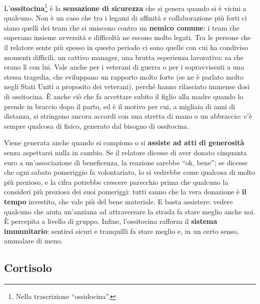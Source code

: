 L'\textbf{ossitocina}\footnote{Nella trascrizione ``ossidocina''.} è la \textbf{sensazione di
sicurezza} che si genera quando si è vicini a qualcuno. Non è un caso che tra i legami di
affinità e collaborazione più forti ci siano quelli dei team che si uniscono contro un
\textbf{nemico comune}: i team che superano insieme avversità e difficoltà ne escono molto
legati. Tra le persone che il relatore sente più spesso in questo periodo ci sono quelle con cui
ha condiviso momenti difficili, un cattivo manager, una brutta esperienza lavorativa: sa che
erano lì con lui. Vale anche per i veterani di guerra o per i sopravvissuti a una stessa
tragedia, che sviluppano un rapporto molto forte (se ne è parlato molto negli Stati Uniti a
proposito dei veterani), perché hanno rilasciato immense dosi di ossitocina. È anche ciò che fa
accettare subito il figlio alla madre quando lo prende in braccio dopo il parto, ed è il motivo
per cui, a migliaia di anni di distanza, si stringono ancora accordi con una stretta di mano o
un abbraccio: c'è sempre qualcosa di fisico, generato dal bisogno di ossitocina.

Viene generata anche quando si compiono o si \textbf{assiste ad atti di generosità} senza
aspettarsi nulla in cambio. Se il relatore dicesse di aver donato cinquanta euro a
un'associazione di beneficenza, la reazione sarebbe ``ok, bene''; se dicesse che ogni sabato
pomeriggio fa volontariato, lo si vedrebbe come qualcosa di molto più prezioso, e la cifra
potrebbe crescere parecchio prima che qualcuno la consideri più preziosa dei suoi pomeriggi:
tutti sanno che la vera donazione è \textbf{il tempo} investito, che vale più del bene
materiale. E basta assistere: vedere qualcuno che aiuta un'anziana ad attraversare la strada fa
stare meglio anche noi. È percepita a livello di gruppo. Infine, l'ossitocina rafforza il
\textbf{sistema immunitario}: sentirsi sicuri e tranquilli fa stare meglio e, in un certo senso,
ammalare di meno.

\subsection{Cortisolo}

